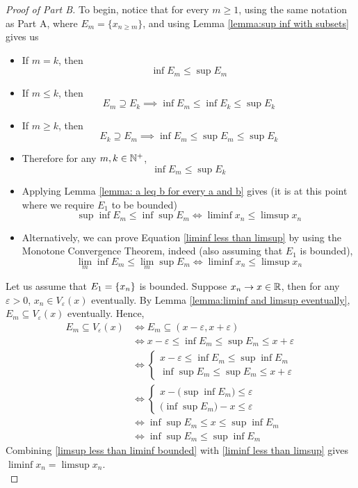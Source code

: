 \documentclass[../../main.tex]{subfiles}
\begin{document}
\begin{proof}[Proof of Part B]
    To begin, notice that for every $m\geq 1$, using the same notation as Part A, where $E_m = \{x_{n\geq m}\}$, and using Lemma \ref{lemma:sup inf with subsets} gives us
    \begin{itemize}
        \item If $m=k$, then
        \[
        \inf E_m\leq \sup E_m
        \]
        \item If $m\leq k$, then 
        \[E_m\supseteq E_k\implies \inf E_m\leq \inf E_k\leq \sup E_k\]
        \item If $m\geq k$, then
        \[E_k\supseteq E_m\implies \inf E_m\leq \sup E_m\leq \sup E_k\]
        \item Therefore for any $m,k\in\mathbb{N}^+$,
        \[
        \inf E_m\leq \sup E_k
        \]
        \item Applying Lemma \ref{lemma: a leq b for every a and b} gives (it is at this point where we require $E_1$ to be bounded)
        \begin{equation}\label{liminf less than limsup}
        \sup\inf E_m\leq \inf\sup E_m\iff \liminf x_n\leq \limsup x_n
        \end{equation}
        \item Alternatively, we can prove Equation \eqref{liminf less than limsup} by using the Monotone Convergence Theorem, indeed (also assuming that $E_1$ is bounded), 
        \[
        \lim_m \inf E_m\leq \lim_m \sup E_m \iff \liminf x_n\leq \limsup x_n
        \]
    \end{itemize}
    Let us assume that $E_1=\{x_n\}$ is bounded. Suppose $x_n\to x\in\mathbb{R}$, then for any $\varepsilon>0$, $x_n\in V_\varepsilon(x)$ eventually. By Lemma \ref{lemma:liminf and limsup eventually}, $E_m\subseteq V_\varepsilon(x)$ eventually. Hence,
    \begin{align}
        E_m\subseteq V_\varepsilon(x)&\iff E_m\subseteq (x-\varepsilon, x+\varepsilon)\nonumber\\
        &\iff x-\varepsilon\leq \inf E_m\leq \sup E_m\leq x+\varepsilon\nonumber\\
        &\iff \begin{cases}
        x-\varepsilon\leq\inf E_m\leq \sup\inf E_m\\
        \inf\sup E_m\leq \sup E_m\leq x+\varepsilon\end{cases}\nonumber\\
        &\iff \begin{cases}
        x-\biggl(\sup\inf E_m\biggr)\leq \varepsilon\\
        \biggl(\inf\sup E_m\biggr) -x\leq \varepsilon
        \end{cases}\nonumber\\
        &\iff 
        \inf\sup E_m\leq x\leq\sup\inf E_m\nonumber\\
        &\iff \inf\sup E_m\leq \sup\inf E_m\label{limsup less than liminf bounded}
    \end{align}
    Combining \eqref{limsup less than liminf bounded} with \eqref{liminf less than limsup} gives $\liminf x_n=\limsup x_n$.\\
    

\end{proof}
\end{document}
